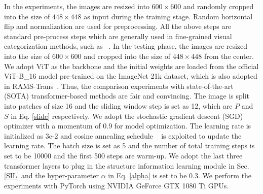 \documentclass[sigconf, nonacm]{acmart}
\begin{document}
In the experiments, the images are resized into $600 \times 600$ and randomly cropped into the size of $448 \times 448$ as input during the training stage. Random horizontal flip and normalization are used for preprocessing. All the above steps are standard pre-process steps which are generally used in fine-grained visual categorization methods, such as ~\cite{hu2021rams}. In the testing phase, the images are resized into the size of $600 \times 600$ and cropped into the size of $448 \times 448$ from the center. We adopt ViT as the backbone and the initial weights are loaded from the official ViT-B\_16 model pre-trained on the ImageNet 21k dataset, which is also adopted in RAMS-Trans~\cite{hu2021rams}. Thus, the comparison experiments with state-of-the-art (SOTA) transformer-based methods are fair and convincing. The image is split into patches of size 16 and the sliding window step is set as 12, which are $P$ and $S$ in Eq. \ref{slide} respectively. We adopt the stochastic gradient descent (SGD) optimizer with a momentum of 0.9 for model optimization. The learning rate is initialized as 3e-2 and cosine annealing schedule ~\cite{loshchilov2016sgdr} is exploited to update the learning rate. The batch size is set as 5 and the number of total training steps is set to be 10000 and the first 500 steps are warm-up. We adopt the last three transformer layers to plug in the structure information learning module in Sec. \ref{SIL} and the hyper-parameter $\alpha $ in Eq. \ref{alpha} is set to be 0.3. We perform the experiments with PyTorch using NVIDIA GeForce GTX 1080 Ti GPUs.
\end{document}
